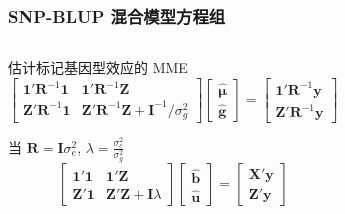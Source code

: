 \documentclass[serif,aspectratio=169]{beamer}
\begin{document}
\begin{frame}
\begin{columns}
\begin{frame}
  \frametitle{SNP-BLUP 混合模型方程组}
  \begin{columns}
    \begin{column}{.6\textwidth}
      \begin{block}{估计标记基因型效应的 MME}
        $$
        \left[\begin{array}{ll}
            \mathbf{1}'\mathbf{R}^{-1}\mathbf{1} & \mathbf{1}'\mathbf{R}^{-1}\mathbf{Z}\\
            \mathbf{Z}'\mathbf{R}^{-1}\mathbf{1} & \mathbf{Z}'\mathbf{R}^{-1}\mathbf{Z}+\mathbf{I}^{-1}/\sigma_g^2
          \end{array}\right]
        \left[\begin{array}{cc}
            \hat{\mathbf{\mu}}\\
            \hat{\mathbf{g}}
          \end{array}\right] = 
        \left[\begin{array}{c}
            \mathbf{1}'\mathbf{R}^{-1}\mathbf{y}\\
            \mathbf{Z}'\mathbf{R}^{-1}\mathbf{y}
          \end{array}\right]
        $$
      \end{block}

      \begin{block}{当 $\mathbf{R=I}\sigma_e^2$, $\lambda=\frac{\sigma_e^2}{\sigma_g^2}$}
        $$
        \left[\begin{array}{ll}
            \mathbf{1}'\mathbf{1} & \mathbf{1}'\mathbf{Z}\\
            \mathbf{Z}'\mathbf{1} & \mathbf{Z}'\mathbf{Z}+\mathbf{I}\lambda
          \end{array}\right]
        \left[\begin{array}{cc}
            \hat{\mathbf{b}}\\
            \hat{\mathbf{u}}
          \end{array}\right] = 
        \left[\begin{array}{c}
            \mathbf{X}'\mathbf{y}\\
            \mathbf{Z}'\mathbf{y}
          \end{array}\right]
        $$
      \end{block}
    \end{column}


\end{columns}
\end{frame}
\end{columns}
\end{frame}
\end{document}
